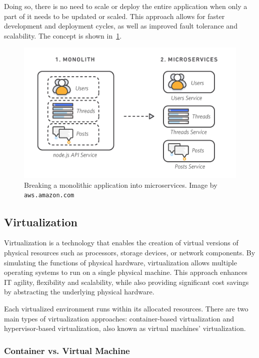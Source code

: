 Doing so, there is no need to scale or deploy the entire application when only a part of it needs to be updated or scaled. This approach allows for faster development and deployment cycles, as well as improved fault tolerance and scalability. The concept is shown in~\cref{fig:monolith-microservices}.

\begin{figure}[h]
  \centering
  \includegraphics[scale=0.6]{chapters/02/assets/monolith-microservices.png}
  \caption[Breaking a monolithic application into microservices]{Breaking a monolithic application into microservices. Image by \texttt{aws.amazon.com}}
  \label{fig:monolith-microservices}
\end{figure}

\subsection{Virtualization}

Virtualization is a technology that enables the creation of virtual versions of physical resources such as processors, storage devices, or network components. By simulating the functions of physical hardware, virtualization allows multiple operating systems to run on a single physical machine. This approach enhances IT agility, flexibility and scalability, while also providing significant cost savings by abstracting the underlying physical hardware.~\cite{virtualization-aws}

Each virtualized environment runs within its allocated resources. There are two main types of virtualization approaches: container-based virtualization and hypervisor-based virtualization, also known as virtual machines' virtualization.

\subsubsection{Container vs. Virtual Machine}


